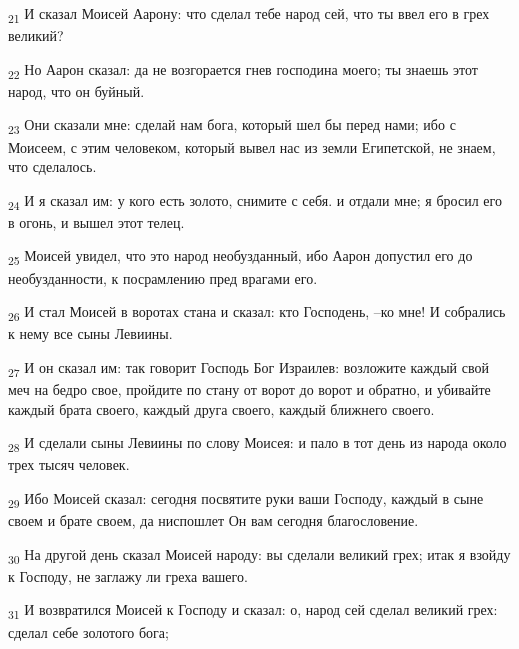 \begin{tcolorbox}
\textsubscript{21} И сказал Моисей Аарону: что сделал тебе народ сей, что ты ввел его в грех великий?
\end{tcolorbox}
\begin{tcolorbox}
\textsubscript{22} Но Аарон сказал: да не возгорается гнев господина моего; ты знаешь этот народ, что он буйный.
\end{tcolorbox}
\begin{tcolorbox}
\textsubscript{23} Они сказали мне: сделай нам бога, который шел бы перед нами; ибо с Моисеем, с этим человеком, который вывел нас из земли Египетской, не знаем, что сделалось.
\end{tcolorbox}
\begin{tcolorbox}
\textsubscript{24} И я сказал им: у кого есть золото, снимите с себя. и отдали мне; я бросил его в огонь, и вышел этот телец.
\end{tcolorbox}
\begin{tcolorbox}
\textsubscript{25} Моисей увидел, что это народ необузданный, ибо Аарон допустил его до необузданности, к посрамлению пред врагами его.
\end{tcolorbox}
\begin{tcolorbox}
\textsubscript{26} И стал Моисей в воротах стана и сказал: кто Господень, --ко мне! И собрались к нему все сыны Левиины.
\end{tcolorbox}
\begin{tcolorbox}
\textsubscript{27} И он сказал им: так говорит Господь Бог Израилев: возложите каждый свой меч на бедро свое, пройдите по стану от ворот до ворот и обратно, и убивайте каждый брата своего, каждый друга своего, каждый ближнего своего.
\end{tcolorbox}
\begin{tcolorbox}
\textsubscript{28} И сделали сыны Левиины по слову Моисея: и пало в тот день из народа около трех тысяч человек.
\end{tcolorbox}
\begin{tcolorbox}
\textsubscript{29} Ибо Моисей сказал: сегодня посвятите руки ваши Господу, каждый в сыне своем и брате своем, да ниспошлет Он вам сегодня благословение.
\end{tcolorbox}
\begin{tcolorbox}
\textsubscript{30} На другой день сказал Моисей народу: вы сделали великий грех; итак я взойду к Господу, не заглажу ли греха вашего.
\end{tcolorbox}
\begin{tcolorbox}
\textsubscript{31} И возвратился Моисей к Господу и сказал: о, народ сей сделал великий грех: сделал себе золотого бога;
\end{tcolorbox}
